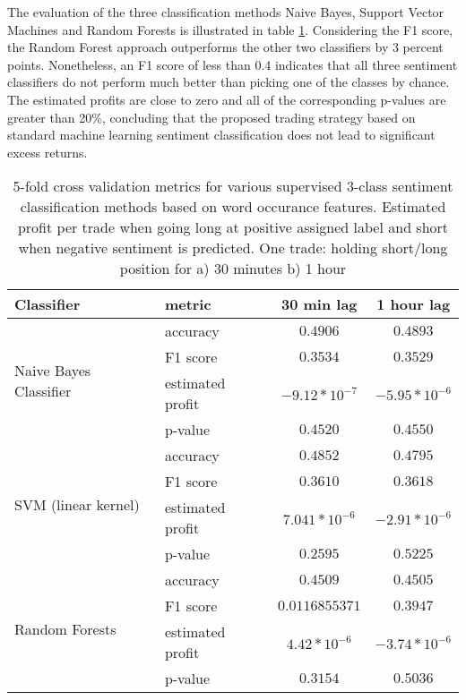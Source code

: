 \documentclass[a4paper,12pt]{article}%
\begin{document}
The evaluation of the three classification methods Naive Bayes, Support Vector Machines and Random Forests is illustrated in table \ref{table:bag-of-words-results}. Considering the F1 score, the Random Forest approach outperforms the other two classifiers by 3 percent points. Nonetheless, an F1 score of less than 0.4 indicates that all three sentiment classifiers do not perform much better than picking one of the classes by chance.
The estimated profits are close to zero and all of the corresponding p-values are greater than 20\%, concluding that the proposed trading strategy based on standard machine learning sentiment classification does not lead to significant excess returns.

\begin{table}
\centering
\captionsetup{justification=centering}
\begin{tabular}{ |l|l|c|c| }
\hline
Classifier & metric & 30 min lag & 1 hour lag \\ \hline
\multirow{4}{*}{Naive Bayes Classifier} & accuracy & $0.4906$ & $0.4893$ \\
 & F1 score & $0.3534$ & $0.3529$ \\
 & estimated profit & $-9.12 * 10^{-7}$ & $-5.95 * 10^{-6}$ \\ 
 & p-value & $0.4520$& $0.4550$\\ \hline
\multirow{4}{*}{SVM (linear kernel)} & accuracy & $0.4852$ & $0.4795$ \\
 & F1 score & $0.3610$ & $0.3618$ \\
 & estimated profit & $7.041 * 10^{-6}$ & $-2.91 * 10^{-6}$ \\
  & p-value & $0.2595$ & $0.5225$\\ \hline
\multirow{4}{*}{Random Forests} & accuracy & $0.4509$ & $0.4505$ \\
 & F1 score & $0.0116855371$ & $0.3947$ \\
 & estimated profit & $4.42 * 10^{-6}$ & $-3.74 * 10^{-6}$ \\
  & p-value & $0.3154$ & $0.5036$ \\ \hline
\end{tabular}
\caption{5-fold cross validation metrics for various supervised 3-class sentiment classification methods based on word occurance features. Estimated profit per trade when going long at positive assigned label and short when negative sentiment is predicted. One trade: holding short/long position for a) 30 minutes b) 1 hour\label{table:bag-of-words-results}}
\end{table}
\end{document}
